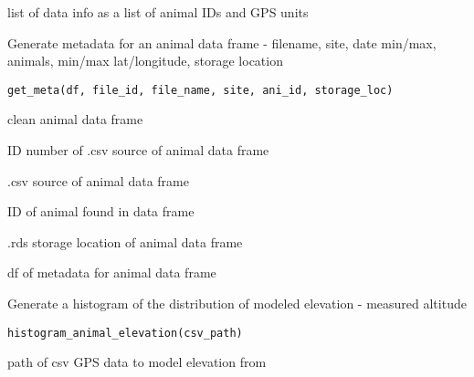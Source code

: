 \documentclass[a4paper]{book}
\begin{document}
%
\begin{Value}
list of data info as a list of animal IDs and GPS units
\end{Value}
%
\begin{Description}\relax
Generate metadata for an animal data frame -
filename, site, date min/max, animals, min/max lat/longitude, storage location
\end{Description}
%
\begin{Usage}
\begin{verbatim}
get_meta(df, file_id, file_name, site, ani_id, storage_loc)
\end{verbatim}
\end{Usage}
%
\begin{Arguments}
\begin{ldescription}
\item[\code{df}] clean animal data frame

\item[\code{file\_id}] ID number of .csv source of animal data frame

\item[\code{file\_name}] .csv source of animal data frame

\item[\code{ani\_id}] ID of animal found in data frame

\item[\code{storage\_loc}] .rds storage location of animal data frame
\end{ldescription}
\end{Arguments}
%
\begin{Value}
df of metadata for animal data frame
\end{Value}
%
\begin{Description}\relax
Generate a histogram of the distribution of modeled elevation - measured altitude
\end{Description}
%
\begin{Usage}
\begin{verbatim}
histogram_animal_elevation(csv_path)
\end{verbatim}
\end{Usage}
%
\begin{Arguments}
\begin{ldescription}
\item[\code{csv\_path}] path of csv GPS data to model elevation from
\end{ldescription}
\end{Arguments}
\end{document}

